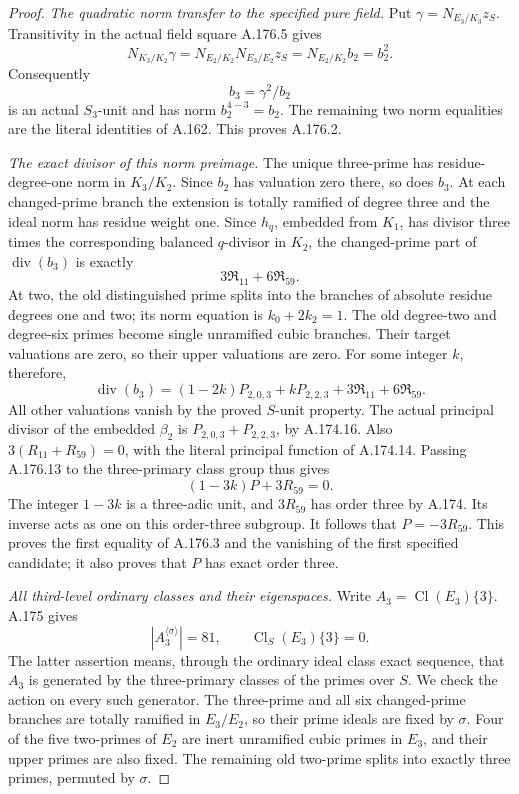 \begin{proof}
\emph{The quadratic norm transfer to the specified pure field.}
Put \(\gamma=N_{E_3/K_3}z_S\).
Transitivity in the actual field square A.176.5 gives
\[
 N_{K_3/K_2}\gamma
   =N_{E_2/K_2}N_{E_3/E_2}z_S
   =N_{E_2/K_2}b_2=b_2^2 .
\tag{A.176.10}
\]
Consequently
\[
                              b_3=\gamma^2/b_2
\tag{A.176.11}
\]
is an actual \(S_3\)-unit and has norm \(b_2^{4-3}=b_2\).
The remaining two norm equalities are the literal identities
of A.162.  This proves A.176.2.

\emph{The exact divisor of this norm preimage.}
The unique three-prime has residue-degree-one norm in
\(K_3/K_2\).  Since \(b_2\) has valuation zero there,
so does \(b_3\).
At each changed-prime branch the extension is totally ramified
of degree three and the ideal norm has residue weight one.
Since \(h_q\), embedded from \(K_1\), has divisor
three times the corresponding balanced \(q\)-divisor in \(K_2\),
the changed-prime part of \(\operatorname{div}(b_3)\) is exactly
\[
                         3\mathfrak R_{11}+6\mathfrak R_{59}.
\tag{A.176.12}
\]
At two, the old distinguished prime splits into the branches
of absolute residue degrees one and two; its norm equation is
\(k_0+2k_2=1\).
The old degree-two and degree-six primes become single unramified
cubic branches.  Their target valuations are zero, so their
upper valuations are zero.
For some integer \(k\), therefore,
\[
 \operatorname{div}(b_3)=
 (1-2k)P_{2,0,3}+kP_{2,2,3}
                 +3\mathfrak R_{11}+6\mathfrak R_{59}.
\tag{A.176.13}
\]
All other valuations vanish by the proved \(S\)-unit property.
The actual principal divisor of the embedded \(\beta_2\) is
\(P_{2,0,3}+P_{2,2,3}\), by A.174.16.
Also \(3(R_{11}+R_{59})=0\), with the literal principal
function of A.174.14.
Passing A.176.13 to the three-primary class group thus gives
\[
                         (1-3k)P+3R_{59}=0 .
\tag{A.176.14}
\]
The integer \(1-3k\) is a three-adic unit, and \(3R_{59}\)
has order three by A.174.
Its inverse acts as one on this order-three subgroup.
It follows that \(P=-3R_{59}\).
This proves the first equality of A.176.3 and the vanishing
of the first specified candidate; it also proves that \(P\)
has exact order three.

\emph{All third-level ordinary classes and their eigenspaces.}
Write \(A_3=\operatorname{Cl}(E_3)\{3\}\).
A.175 gives
\[
                   |A_3^{\langle\sigma\rangle}|=81,
                  \qquad\operatorname{Cl}_{S}(E_3)\{3\}=0.
\tag{A.176.15}
\]
The latter assertion means, through the ordinary ideal class
exact sequence, that \(A_3\) is generated by the three-primary
classes of the primes over \(S\).
We check the action on every such generator.
The three-prime and all six changed-prime branches are totally
ramified in \(E_3/E_2\), so their prime ideals are fixed by
\(\sigma\).
Four of the five two-primes of \(E_2\) are inert unramified
cubic primes in \(E_3\), and their upper primes are also fixed.
The remaining old two-prime splits into exactly three primes,
permuted by \(\sigma\).


\end{proof}
